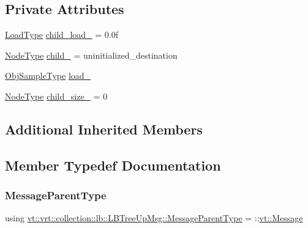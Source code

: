 \subsection*{Private Attributes}
\begin{DoxyCompactItemize}
\item 
\hyperlink{namespacevt_a8fb51741340b87d7aaee0bef60e9896b}{Load\+Type} \hyperlink{structvt_1_1vrt_1_1collection_1_1lb_1_1_l_b_tree_up_msg_a8cf642de573d3ee48b854d1fbb3a5263}{child\+\_\+load\+\_\+} = 0.\+0f
\item 
\hyperlink{namespacevt_a866da9d0efc19c0a1ce79e9e492f47e2}{Node\+Type} \hyperlink{structvt_1_1vrt_1_1collection_1_1lb_1_1_l_b_tree_up_msg_ab369301f3bdf74cd6fbf5e5a5c885ce6}{child\+\_\+} = uninitialized\+\_\+destination
\item 
\hyperlink{structvt_1_1vrt_1_1collection_1_1lb_1_1_hier_l_b_types_a597a60d517207b90e8c7984eac434e8f}{Obj\+Sample\+Type} \hyperlink{structvt_1_1vrt_1_1collection_1_1lb_1_1_l_b_tree_up_msg_a9ed67bba04ee9261cb5d4a929170e28c}{load\+\_\+}
\item 
\hyperlink{namespacevt_a866da9d0efc19c0a1ce79e9e492f47e2}{Node\+Type} \hyperlink{structvt_1_1vrt_1_1collection_1_1lb_1_1_l_b_tree_up_msg_a3cf0b8cbf9a3669179119b40c2c38663}{child\+\_\+size\+\_\+} = 0
\end{DoxyCompactItemize}
\subsection*{Additional Inherited Members}


\subsection{Member Typedef Documentation}
\mbox{\label{structvt_1_1vrt_1_1collection_1_1lb_1_1_l_b_tree_up_msg_a476415f74c2143a0761fe8cca883f5b6}} 
\subsubsection{\texorpdfstring{Message\+Parent\+Type}{MessageParentType}}
{\footnotesize\ttfamily using \hyperlink{structvt_1_1vrt_1_1collection_1_1lb_1_1_l_b_tree_up_msg_a476415f74c2143a0761fe8cca883f5b6}{vt\+::vrt\+::collection\+::lb\+::\+L\+B\+Tree\+Up\+Msg\+::\+Message\+Parent\+Type} =  \+::\hyperlink{namespacevt_a3a3ddfef40b4c90915fa43cdd5f129ea}{vt\+::\+Message}}



